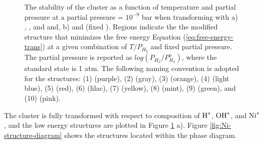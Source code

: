 \documentclass[journal=jctcce,manuscript=article]{achemso}
\begin{document}
\begin{figure}[H]
{    The stability of the  cluster as a function of temperature and  partial pressure at a  partial pressure = $10^{-9}$ bar when transforming with a)
    , , and  and, b)  and  (fixed ). Regions indicate the the modified structure that minimizes the free energy Equation (\ref{eq:free-energy-trans}) at a given combination of $T/P_{H_{2}}$ and fixed  partial pressure. The  partial pressure is reported as $log(P_{H_{2}}/P_{H_{2}}^{o})$, where the standard state is 1 atm. The following naming convention is adopted for the structures: 
    (1)  (purple),              %
    (2)  (gray),            %
    (3)  (orange),         %
    (4)  (light blue),          %
    (5)  (red),                 %
    (6)  (lilac),                 %
    (7)  (yellow),         %
    (8)  (mint),           %
    (9)   (green),       %
    and  
    (10)  (pink).    %
    }
    \label{fig:phase_diagram_Ni_combined}
\end{figure}   

The cluster is fully transformed with respect to composition of $\ce{H^{*}}$, $\ce{OH^{*}}$, and $\ce{Ni^{*}}$, and the low energy structures are plotted in Figure \ref{fig:phase_diagram_Ni_combined} a). Figure \ref{fig:Ni-structure-diagram} shows the structures located within the phase diagram. 
\end{document}
